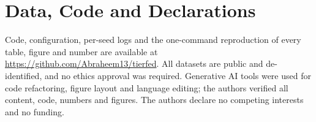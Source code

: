 \documentclass[journal]{IEEEtran}
\begin{document}
\section*{Data, Code and Declarations}
Code, configuration, per-seed logs and the one-command reproduction of every table, figure and number are available at \url{https://github.com/Abraheem13/tierfed}. All datasets are public and de-identified, and no ethics approval was required. Generative AI tools were used for code refactoring, figure layout and language editing; the authors verified all content, code, numbers and figures. The authors declare no competing interests and no funding.



\end{document}
